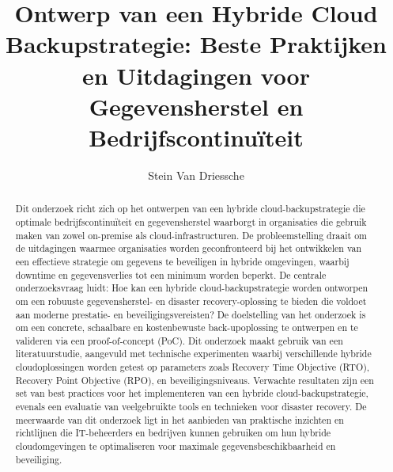 \documentclass{hogent-article}
\title{Ontwerp van een Hybride Cloud Backupstrategie: Beste Praktijken en Uitdagingen voor Gegevensherstel en Bedrijfscontinuïteit}
\author{Stein Van Driessche}
\begin{document}
    
    \begin{abstract}
        Dit onderzoek richt zich op het ontwerpen van een hybride cloud-backupstrategie die optimale bedrijfscontinuïteit en gegevensherstel waarborgt in organisaties die gebruik maken van zowel on-premise als cloud-infrastructuren. De probleemstelling draait om de uitdagingen waarmee organisaties worden geconfronteerd bij het ontwikkelen van een effectieve strategie om gegevens te beveiligen in hybride omgevingen, waarbij downtime en gegevensverlies tot een minimum worden beperkt. De centrale onderzoeksvraag luidt: Hoe kan een hybride cloud-backupstrategie worden ontworpen om een robuuste gegevensherstel- en disaster recovery-oplossing te bieden die voldoet aan moderne prestatie- en beveiligingsvereisten? De doelstelling van het onderzoek is om een concrete, schaalbare en kostenbewuste back-upoplossing te ontwerpen en te valideren via een proof-of-concept (PoC). Dit onderzoek maakt gebruik van een literatuurstudie, aangevuld met technische experimenten waarbij verschillende hybride cloudoplossingen worden getest op parameters zoals Recovery Time Objective (RTO), Recovery Point Objective (RPO), en beveiligingsniveaus. Verwachte resultaten zijn een set van best practices voor het implementeren van een hybride cloud-backupstrategie, evenals een evaluatie van veelgebruikte tools en technieken voor disaster recovery. De meerwaarde van dit onderzoek ligt in het aanbieden van praktische inzichten en richtlijnen die IT-beheerders en bedrijven kunnen gebruiken om hun hybride cloudomgevingen te optimaliseren voor maximale gegevensbeschikbaarheid en beveiliging.
    \end{abstract}
    
    \tableofcontents
    
    
    
    \printbibliography[heading=bibintoc]
    
\end{document}
